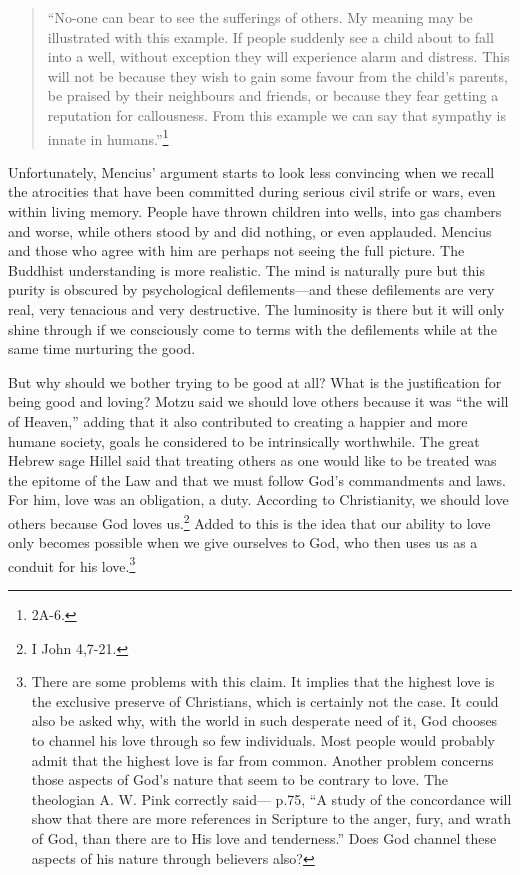 \documentclass[10pt, openright]{book}
\begin{document}
\begin{quote}


“No-one can bear to see the sufferings of others. My meaning may be illustrated with this example. If people suddenly see a child about to fall into a well, without exception they will experience alarm and distress. This will not be because they wish to gain some favour from the child’s parents, be praised by their neighbours and friends, or because they fear getting a reputation for callousness. From this example we can say that sympathy is innate in humans.”\footnote {\textit{\cite{The Mencius}} 2A-6.}




\end{quote}
Unfortunately, Mencius’ argument starts to look less convincing when we recall the atrocities that have been committed during serious civil strife or wars, even within living memory. People have thrown children into wells, into gas chambers and worse, while others stood by and did nothing, or even applauded. Mencius and those who agree with him are perhaps not seeing the full picture. The Buddhist understanding is more realistic. The mind is naturally pure but this purity is obscured by psychological defilements—and these defilements are very real, very tenacious and very destructive. The luminosity is there but it will only shine through if we consciously come to terms with the defilements while at the same time nurturing the good.


But why should we bother trying to be good at all? What is the justification for being good and loving? Motzu said we should love others because it was “the will of Heaven,” adding that it also contributed to creating a happier and more humane society, goals he considered to be intrinsically worthwhile. The great Hebrew sage Hillel said that treating others as one would like to be treated was the epitome of the Law and that we must follow God’s commandments and laws. For him, love was an obligation, a duty. According to Christianity, we should love others because God loves us.\footnote {I John 4,7-21.} Added to this is the idea that our ability to love only becomes possible when we give ourselves to God, who then uses us as a conduit for his love.\footnote {There are some problems with this claim. It implies that the highest love is the exclusive preserve of Christians, which is certainly not the case. It could also be asked why, with the world in such desperate need of it, God chooses to channel his love through so few individuals. Most people would probably admit that the highest love is far from common. Another problem concerns those aspects of God’s nature that seem to be contrary to love. The theologian A. W. Pink correctly said—\cite{Pink 1968} p.75, “A study of the concordance will show that there are more references in Scripture to the anger, fury, and wrath of God, than there are to His love and tenderness.” Does God channel these aspects of his nature through believers also?}
\end{document}
